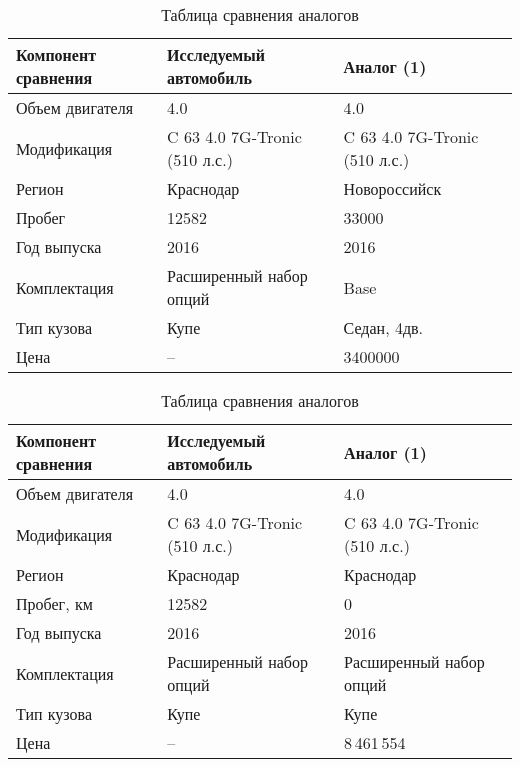 \begin{longtable}{|p{5cm}|p{5cm}|p{5cm}|}
	\caption[]{\footnotesize {Таблица сравнения аналогов}} \label{tab:сравнитьаналог}\\ 
	\hline
		\rowcolor[gray]{0.95}
	Компонент сравнения & Исследуемый автомобиль& Аналог (1)  \\ \hline \endhead %
	Объем двигателя  &4.0 & 4.0 \\ \hline
	Модификация  &C 63 4.0 7G-Tronic (510 л.с.)  & C 63 4.0 7G-Tronic (510 л.с.) \\ \hline
	Регион  & Краснодар  & Новороссийск\\ \hline
	\rowcolor[HTML]{ FAEBD7} 
	Пробег & 12582   & 33000\\ \hline
	Год выпуска  & 2016  & 2016 \\ \hline
	\rowcolor[HTML]{ FAEBD7} 
	Комплектация  & Расширенный набор опций  & Base \\ \hline
	\rowcolor[HTML]{ FAEBD7} 
	Тип кузова  & Купе  & Седан, 4дв. \\ \hline
	Цена  & --  & 3400000 \\ \hline
\end{longtable}




  \begin{longtable}{|p{5cm}|p{5cm}|p{5cm}|}
	\caption[]{\footnotesize {Таблица сравнения аналогов}} \label{tab:12}\\ 
	\hline
	\rowcolor[HTML]{EFEFEF} 
	Компонент сравнения & Исследуемый автомобиль& Аналог (1)  \\ \hline \endhead %
	Объем двигателя  &4.0 & 4.0 \\ \hline
	Модификация  &C 63 4.0 7G-Tronic (510 л.с.)  & C 63 4.0 7G-Tronic (510 л.с.)\\ \hline
	Регион  & Краснодар  & Краснодар\\ \hline
	Пробег, км & 12582  & 0\\ \hline
	Год выпуска  & 2016  & 2016 \\ \hline
	Комплектация  & Расширенный набор опций  & Расширенный набор опций \\ \hline
	Тип кузова  & Купе  & Купе \\ \hline
	Цена  &  -- & 8\,461\,554 \\ \hline
\end{longtable}






